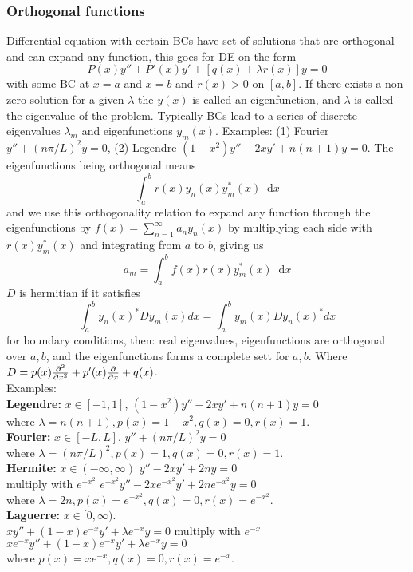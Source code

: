 \documentclass[a4paper, 10pt]{article}
\newcommand*\diff{\mathop{}\!\mathrm{d}}
\begin{document}
\begin{multicols*}{3}
\subsubsection*{Orthogonal functions}
Differential equation with certain BCs have set of solutions that are orthogonal and can expand any function, this goes for DE on the form
$$ P(x)y'' + P'(x)y' + \left[q(x) + \lambda r(x)\right]y = 0 $$
with some BC at $x=a$ and $x=b$ and $r(x)>0$ on $[a,b]$. If there exists a non-zero solution for a given $\lambda$ the $y(x)$ is called an eigenfunction, and $\lambda$ is called the eigenvalue of the problem. Typically BCs lead to a series of discrete eigenvalues $\lambda_m$ and eigenfunctions $y_m(x)$. Examples: (1) Fourier $y'' + (n\pi/L)^2y=0$, (2) Legendre $(1-x^2)y'' - 2xy'+n(n+1)y = 0$. The eigenfunctions being orthogonal means
$$ \int_a^br(x)y_n(x)y_m^*(x)\diff x $$
and we use this orthogonality relation to expand any function through the eigenfunctions by $f(x) = \sum_{n=1}^\infty a_n y_n(x)$ by multiplying each side with $r(x)y_m^*(x)$ and integrating from $a$ to $b$, giving us
$$ a_m = \int_a^b f(x)r(x)y_m^*(x) \diff x$$
$D$ is hermitian if it satisfies
\[
\int_{a}^{b}y_n(x)^*D y_m(x) dx = \int_{a}^{b} y_m(x) D y_n(x)^* dx
\]
for boundary conditions, then: real eigenvalues, eigenfunctions are orthogonal over $a,b$, and the eigenfunctions forms a complete sett for $a,b$. Where $D= p(x)\pdv[2]{}{x}+p'(x)\pdv{}{x} +q(x)$.\\
Examples:\\
\textbf{Legendre:} $x\in[-1,1]$,
$(1-x^2)y''-2xy'+n(n+1)y=0$ \\
where $\lambda=n(n+1), p(x)=1-x^2, q(x)=0, r(x)=1$. \\
\textbf{Fourier:}  $x\in[-L,L]$,
$y''+(n\pi/L)^2y=0$\\
where $\lambda=(n \pi/L)^2, p(x)=1, q(x)=0, r(x)=1$. \\
\textbf{Hermite:} $x\in(-\infty,\infty)$
$y''-2xy'+2ny=0$ \\multiply with $e^{-x^2}$
$e^{-x^2}y''-2xe^{-x^2}y'+2ne^{-x^2}y=0$ \\
where $\lambda=2n, p(x)=e^{-x^2}, q(x)=0, r(x)=e^{-x^2}$. \\
\textbf{Laguerre:} $x\in[0,\infty)$.\\
$xy''+(1-x)e^{-x}y'+\lambda e^{-x} y=0$ multiply with $e^{-x}$\\
$xe^{-x}y''+(1-x)e^{-x}y'+\lambda e^{-x}y = 0$ \\
where $p(x)=xe^{-x}, q(x)=0, r(x)=e^{-x}$. \\


\end{multicols*}
\end{document}
